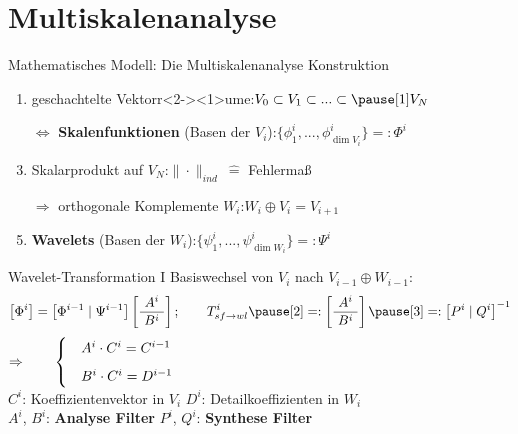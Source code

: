 \section[Multiskalenanalyse \hspace{42mm}\small am Beispiel der eindimensionalen Haar-Wavelets]{Multiskalenanalyse}
	
	\begin{frame}{Mathematisches Modell: Die Multiskalenanalyse}
		\alert{Konstruktion}
		\begin{enumerate}\pause
			\item geschachtelte \pause[1]Vektorr<2-><1>um\pause[2]e:\hspace{16.5mm}$V_0\subset V_1\subset ...\subset \pause[1]V_N$\vspace{2mm}\pause\pause
			\item[$\Leftrightarrow$\hspace{-0.3mm}] {\bf Skalenfunktionen} (Basen der $V_i$):\hspace{8mm}$\{\phi^i_1, ..., \phi^i_{\dim V_i}\}=:\Phi^i$\vspace{2mm}\pause
			\item Skalarprodukt auf $V_N$:\hspace{27.2mm}$\|\cdot\|_{ind}\ \widehat{=}$ Fehlermaß\vspace{2mm}\pause
			\item[$\Rightarrow$\hspace{-0.3mm}] orthogonale Komplemente $W_i$:\hspace{12mm}$W_i\oplus V_i=V_{i+1}$\vspace{2mm}\pause
			\item {\bf Wavelets} (Basen der $W_i$):\hspace{21.5mm}$\{\psi^i_1, ..., \psi^i_{\dim W_i}\}=:\Psi^i$
		\end{enumerate}
	\end{frame}

	\begin{frame}{Wavelet-Transformation I}
		\alert{Basiswechsel} von $V_{i}$ nach $V_{i-1}\oplus W_{i-1}$: \vspace{2mm}\pause[2]\[ \left[ \Phi^i\right] =\left[ \Phi^{i-1}\mid \Psi^{i-1}\right]\left[ \frac{\ A^i\ }{\ B^i\ }\right];\qquad T^i_{sf\rightarrow wl}\pause[2]=:\left[ \frac{\ A^i\ }{\ B^i\ }\right]\pause[3]=:\left[ P^i\mid Q^i\right]^{-1}\vspace{3mm}\]\pause[4]
		$\Rightarrow\qquad \begin{cases}
			&A^i\cdot C^i=C^{i-1}\vspace{2mm}\\
			&B^i\cdot C^i=D^{i-1}
		\end{cases}$\vspace{10mm}\\
		$C^i$: Koeffizientenvektor in $V_i$\hspace{8.8mm} $D^i$: Detailkoeffizienten in $W_i$\vspace{2mm}\\ \pause[3]
		$A^i$, $B^i$: {\bf Analyse Filter}\hspace{22mm} $P^i$, $Q^i$: {\bf Synthese Filter}
	\end{frame}

